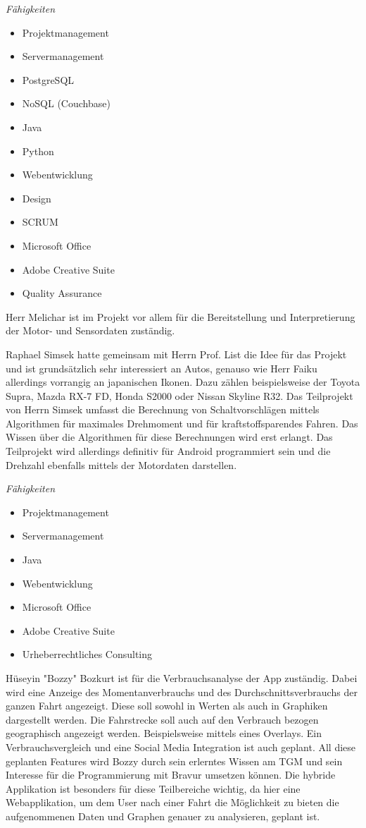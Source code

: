 \textit{Fähigkeiten}
\begin{itemize}
	\item Projektmanagement
	\item Servermanagement				
	\item PostgreSQL
	\item NoSQL (Couchbase)
	\item Java
	\item Python
	\item Webentwicklung
	\item Design
	\item SCRUM
	\item Microsoft Office
	\item Adobe Creative Suite
	\item Quality Assurance
\end{itemize}
Herr Melichar ist im Projekt vor allem für die Bereitstellung und Interpretierung der Motor- und Sensordaten zuständig. 

Raphael Simsek hatte gemeinsam mit Herrn Prof. List die Idee für das Projekt und ist grundsätzlich sehr interessiert an Autos, genauso wie Herr Faiku allerdings vorrangig an japanischen Ikonen. Dazu zählen beispielsweise der Toyota Supra, Mazda RX-7 FD, Honda S2000 oder Nissan Skyline R32. Das Teilprojekt von Herrn Simsek umfasst die Berechnung von Schaltvorschlägen mittels Algorithmen für maximales Drehmoment und für kraftstoffsparendes Fahren. Das Wissen über die Algorithmen für diese Berechnungen wird erst erlangt. Das Teilprojekt wird allerdings definitiv für Android programmiert sein und die Drehzahl ebenfalls mittels der Motordaten darstellen.

\textit{Fähigkeiten}
\begin{itemize}
	\item Projektmanagement
	\item Servermanagement				
	\item Java
	\item Webentwicklung
	\item Microsoft Office
	\item Adobe Creative Suite
	\item Urheberrechtliches Consulting
\end{itemize}

Hüseyin "Bozzy" Bozkurt ist für die Verbrauchsanalyse der App zuständig. Dabei wird eine Anzeige des Momentanverbrauchs und des Durchschnittsverbrauchs der ganzen Fahrt angezeigt. Diese soll sowohl in Werten als auch in Graphiken dargestellt werden. Die Fahrstrecke soll auch auf den Verbrauch bezogen geographisch angezeigt werden. Beispielsweise mittels eines Overlays. Ein Verbrauchsvergleich und eine Social Media Integration ist auch geplant.
All diese geplanten Features wird Bozzy durch sein erlerntes Wissen am TGM und sein Interesse für die Programmierung mit Bravur umsetzen können. Die hybride Applikation ist besonders für diese Teilbereiche wichtig, da hier eine Webapplikation, um dem User nach einer Fahrt die Möglichkeit zu bieten die aufgenommenen Daten und Graphen genauer zu analysieren, geplant ist.

